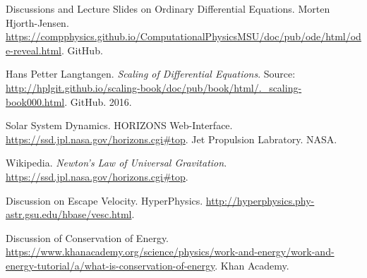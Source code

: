 \documentclass{article}
\begin{document}
\begin{thebibliography}{9}
	 Discussions and Lecture Slides on Ordinary Differential Equations. Morten Hjorth-Jensen. \url{https://compphysics.github.io/ComputationalPhysicsMSU/doc/pub/ode/html/ode-reveal.html}. GitHub. 
    
     Hans Petter Langtangen. \textit{Scaling of Differential Equations}. Source: \url{http://hplgit.github.io/scaling-book/doc/pub/book/html/._scaling-book000.html}. GitHub. 2016.
    
     Solar System Dynamics. HORIZONS Web-Interface. \url{https://ssd.jpl.nasa.gov/horizons.cgi#top}. Jet Propulsion Labratory. NASA.
    
     Wikipedia. \textit{Newton's Law of Universal Gravitation}. \url{https://ssd.jpl.nasa.gov/horizons.cgi#top}. 
    
    	 Discussion on Escape Velocity. HyperPhysics. \url{http://hyperphysics.phy-astr.gsu.edu/hbase/vesc.html}. 
    
     Discussion of Conservation of Energy. \url{https://www.khanacademy.org/science/physics/work-and-energy/work-and-energy-tutorial/a/what-is-conservation-of-energy}. Khan Academy.
\end{thebibliography}
\end{document}
